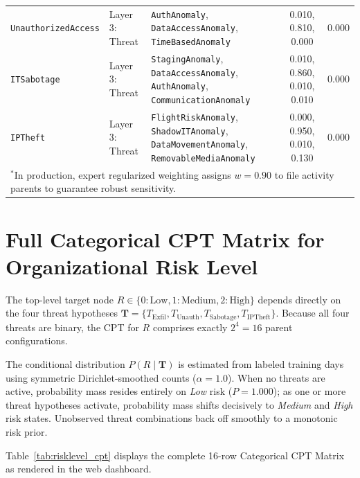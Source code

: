 \documentclass[12pt,a4paper]{report}
\begin{document}
\begin{table}[H]
\begin{tabularx}{\textwidth}{p{}p{}Xcc}
\texttt{UnauthorizedAccess} & Layer 3: Threat & \texttt{AuthAnomaly}, \texttt{DataAccessAnomaly}, \texttt{TimeBasedAnomaly} & 0.010, 0.810, 0.000 & 0.000 \\
\texttt{ITSabotage} & Layer 3: Threat & \texttt{StagingAnomaly}, \texttt{DataAccessAnomaly}, \texttt{AuthAnomaly}, \texttt{CommunicationAnomaly} & 0.010, 0.860, 0.010, 0.010 & 0.000 \\
\texttt{IPTheft} & Layer 3: Threat & \texttt{FlightRiskAnomaly}, \texttt{ShadowITAnomaly}, \texttt{DataMovementAnomaly}, \texttt{RemovableMediaAnomaly} & 0.000, 0.950, 0.010, 0.130 & 0.000 \\
\bottomrule
\multicolumn{5}{l}{\footnotesize $^*$In production, expert regularized weighting assigns $w=0.90$ to file activity parents to guarantee robust sensitivity.}
\end{tabularx}
\end{table}

\section{Full Categorical CPT Matrix for Organizational Risk Level}
The top-level target node $R \in \{0: \text{Low}, 1: \text{Medium}, 2: \text{High}\}$ depends directly on the four threat hypotheses $\mathbf{T} = \{T_{\text{Exfil}}, T_{\text{Unauth}}, T_{\text{Sabotage}}, T_{\text{IPTheft}}\}$. Because all four threats are binary, the CPT for $R$ comprises exactly $2^4 = 16$ parent configurations.

The conditional distribution $P(R \mid \mathbf{T})$ is estimated from labeled training days using symmetric Dirichlet-smoothed counts ($\alpha = 1.0$). When no threats are active, probability mass resides entirely on \textit{Low} risk ($P = 1.000$); as one or more threat hypotheses activate, probability mass shifts decisively to \textit{Medium} and \textit{High} risk states. Unobserved threat combinations back off smoothly to a monotonic risk prior.

Table~\ref{tab:risklevel_cpt} displays the complete 16-row Categorical CPT Matrix as rendered in the web dashboard.
\end{document}
